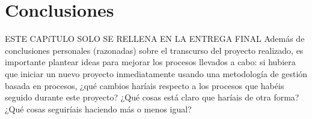 \documentclass[12pt]{article}%
\begin{document}

\section{Conclusiones} %


ESTE CAP\'iTULO SOLO SE RELLENA EN LA ENTREGA FINAL
Adem\'as de conclusiones personales (razonadas) sobre el transcurso del proyecto realizado, es importante plantear ideas para mejorar los procesos llevados a cabo: si hubiera que iniciar un nuevo proyecto inmediatamente usando una metodolog\'ia de gesti\'on basada en procesos, ¿qu\'e cambios har\'iais respecto a los procesos que hab\'eis seguido durante este proyecto?  ¿Qu\'e cosas est\'a claro que har\'iais de otra forma? ¿Qu\'e cosas seguir\'iais haciendo m\'as o menos igual?
\end{document}
